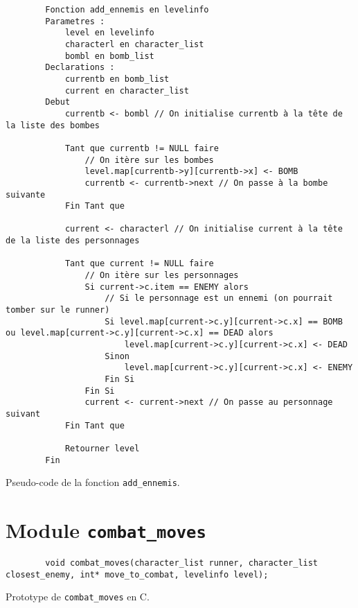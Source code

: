 \begin{longlisting}
    \begin{verbatim}
        Fonction add_ennemis en levelinfo
        Parametres :
            level en levelinfo
            characterl en character_list
            bombl en bomb_list
        Declarations :
            currentb en bomb_list
            current en character_list
        Debut
            currentb <- bombl // On initialise currentb à la tête de la liste des bombes

            Tant que currentb != NULL faire
                // On itère sur les bombes
                level.map[currentb->y][currentb->x] <- BOMB
                currentb <- currentb->next // On passe à la bombe suivante
            Fin Tant que

            current <- characterl // On initialise current à la tête de la liste des personnages

            Tant que current != NULL faire
                // On itère sur les personnages
                Si current->c.item == ENEMY alors
                    // Si le personnage est un ennemi (on pourrait tomber sur le runner)
                    Si level.map[current->c.y][current->c.x] == BOMB ou level.map[current->c.y][current->c.x] == DEAD alors
                        level.map[current->c.y][current->c.x] <- DEAD
                    Sinon
                        level.map[current->c.y][current->c.x] <- ENEMY
                    Fin Si
                Fin Si
                current <- current->next // On passe au personnage suivant
            Fin Tant que

            Retourner level
        Fin
    \end{verbatim}
    \caption{Pseudo-code de la fonction \texttt{add\_ennemis}.}
    \label{listing:c-add_ennemis}
\end{longlisting}

\newpage

\section{Module \texttt{combat\_moves}}
\label{sec:move-to-combat}

\begin{listing}[!htpb]
    \begin{verbatim}
        void combat_moves(character_list runner, character_list closest_enemy, int* move_to_combat, levelinfo level);
    \end{verbatim}
    \caption{Prototype de \texttt{combat\_moves} en C.}
    \label{listing:c-combat_moves-prototype}
\end{listing}

